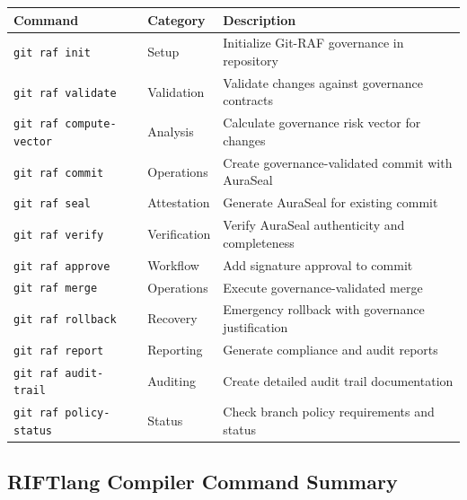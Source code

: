 \documentclass[11pt,letterpaper]{article}
\begin{document}
\begin{longtable}{|p{4cm}|p{3cm}|p{7cm}|}
\hline
\textbf{Command} & \textbf{Category} & \textbf{Description} \\
\hline
\endhead

\texttt{git raf init} & Setup & Initialize Git-RAF governance in repository \\
\hline
\texttt{git raf validate} & Validation & Validate changes against governance contracts \\
\hline
\texttt{git raf compute-vector} & Analysis & Calculate governance risk vector for changes \\
\hline
\texttt{git raf commit} & Operations & Create governance-validated commit with AuraSeal \\
\hline
\texttt{git raf seal} & Attestation & Generate AuraSeal for existing commit \\
\hline
\texttt{git raf verify} & Verification & Verify AuraSeal authenticity and completeness \\
\hline
\texttt{git raf approve} & Workflow & Add signature approval to commit \\
\hline
\texttt{git raf merge} & Operations & Execute governance-validated merge \\
\hline
\texttt{git raf rollback} & Recovery & Emergency rollback with governance justification \\
\hline
\texttt{git raf report} & Reporting & Generate compliance and audit reports \\
\hline
\texttt{git raf audit-trail} & Auditing & Create detailed audit trail documentation \\
\hline
\texttt{git raf policy-status} & Status & Check branch policy requirements and status \\
\hline
\end{longtable}

\subsection{RIFTlang Compiler Command Summary}
\end{document}
